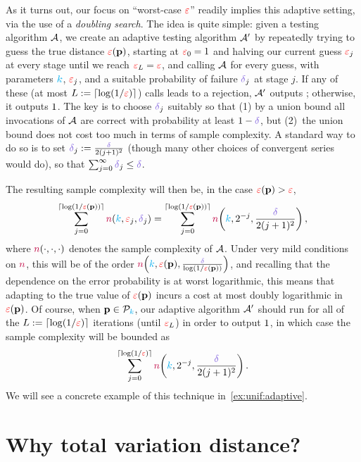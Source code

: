 As it turns out, our focus on ``worst-case $\textcolor{red}{\varepsilon}$'' readily implies this adaptive setting, via the use of a \emph{doubling search}. The idea is quite simple: given a testing algorithm $\mathcal{A}$, we create an adaptive testing algorithm $\mathcal{A}'$ by repeatedly trying to guess the true distance $\textcolor{red}{\varepsilon}(\mathbf{p})$, starting at $\textcolor{red}{\varepsilon}_0=1$ and halving our current guess $\textcolor{red}{\varepsilon}_j$ at every stage until we reach $\textcolor{red}{\varepsilon}_L = \textcolor{red}{\varepsilon}$, and calling $\mathcal{A}$ for every guess, with parameters ${\textcolor{cyan}{k}}$, $\textcolor{red}{\varepsilon}_j$, and a suitable probability of failure $\errprob_j$ at stage $j$. If any of these (at most $L\eqdef \clg{\log(1/\dst)}$) calls leads to a rejection, $\mathcal{A}'$ outputs \reject; otherwise, it outputs $1$. The key is to choose $\errprob_j$ suitably so that (1) by a union bound all invocations of $\mathcal{A}$ are correct with probability at least $1-\errprob$, but (2)~the union bound does not cost too much in terms of sample complexity. A standard way to do so is to set $\errprob_j \eqdef \frac{\errprob}{2(j+1)^2}$ (though many other choices of convergent series would do), so that $\sum_{j=0}^\infty \errprob_j \leq \errprob$.

The resulting sample complexity will then be, in the case $\textcolor{red}{\varepsilon}(\mathbf{p}) > \textcolor{red}{\varepsilon}$,
\[
    \sum_{j=0}^{\clg{\log(1/\dst(\p))}} \ns(\ab, \dst_j, \errprob_j)
    = \sum_{j=0}^{\clg{\log(1/\dst(\p))}} \ns\Paren{\ab, 2^{-j}, \frac{\errprob}{2(j+1)^2}}\,,
\]
where ${\textcolor{purple}{n}}(\cdot,\cdot,\cdot)$ denotes the sample complexity of $\mathcal{A}$. Under very mild conditions on ${\textcolor{purple}{n}}$, this will be of the order $\ns\Paren{\ab, \dst(\p), \frac{\errprob}{\log(1/\dst(\p))}}$, and recalling that the dependence on the error probability is at worst logarithmic, this means that adapting to the true value of $\textcolor{red}{\varepsilon}(\mathbf{p})$ incurs a cost at most doubly logarithmic in $\textcolor{red}{\varepsilon}(\mathbf{p})$. Of course, when $\mathbf{p}\in\mathcal{P}_{\textcolor{cyan}{k}}$, our adaptive algorithm $\mathcal{A}'$ should run for all of the $L\eqdef \clg{\log(1/\dst)}$ iterations (until $\textcolor{red}{\varepsilon}_L$) in order to output $1$, in which case the sample complexity will be bounded as
\[
    \sum_{j=0}^{\clg{\log(1/\dst)}} \ns\Paren{\ab, 2^{-j}, \frac{\errprob}{2(j+1)^2}}\,.
\]
We will see a concrete example of this technique in~\cref{ex:unif:adaptive}.

\section{Why total variation distance?}

